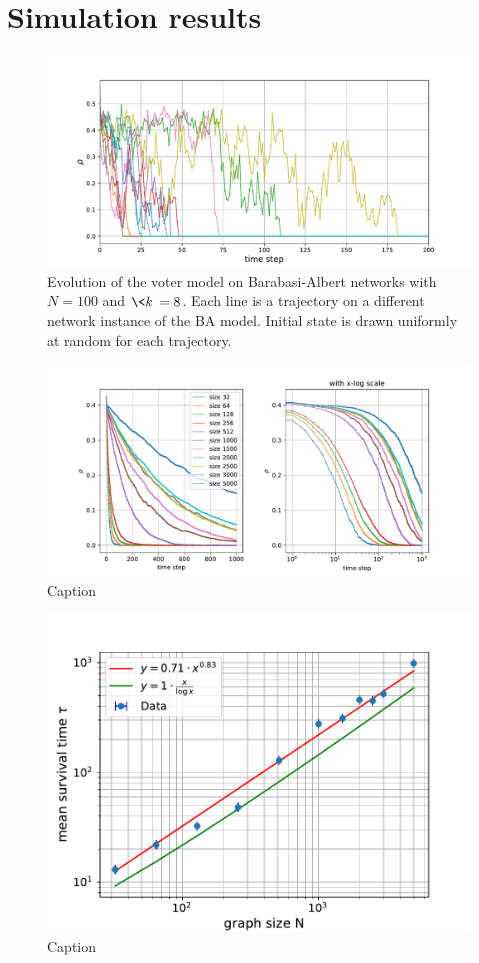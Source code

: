 \section{Simulation results}
\begin{figure}[H]
    \centering
    \includegraphics[width=\linewidth]{latex_source/images/voter/example_evolution.pdf}
    \caption{Evolution of the voter model on Barabasi-Albert networks with $N=100$ and $\<k\> = 8$. Each line is a trajectory on a different network instance of the BA model. Initial state is drawn uniformly at random for each trajectory.}
    \label{fig:enter-label}
\end{figure}

\begin{figure}[H]
    \centering
    \includegraphics[width=\linewidth]{latex_source/images/voter/BA_node_update_rule_results_logscale.pdf}
    \caption{Caption}
    \label{fig:enter-label}
\end{figure}

\begin{figure}[H]
    \centering
    \includegraphics[width=\linewidth]{latex_source/images/voter/BA_time_scaling.pdf}
    \caption{Caption}
    \label{fig:enter-label}
\end{figure}
